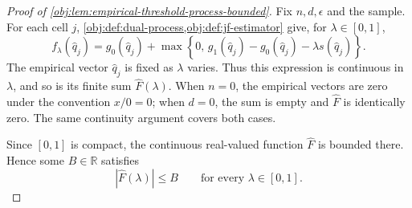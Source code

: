 \begin{proof}[Proof of \cref{obj:lem:empirical-threshold-process-bounded}]
Fix \(n,d,\epsilon\) and the sample. For each cell \(j\), \cref{obj:def:dual-process,obj:def:jf-estimator} give, for \(\lambda\in[0,1]\),
\[
f_\lambda(\widehat q_j)
=
g_0(\widehat q_j)
+
\max\!\left\{0,\,
g_1(\widehat q_j)-g_0(\widehat q_j)
-\lambda s(\widehat q_j)\right\}.
\]
The empirical vector \(\widehat q_j\) is fixed as \(\lambda\) varies. Thus this expression is continuous in \(\lambda\), and so is its finite sum \(\widehat F(\lambda)\). When \(n=0\), the empirical vectors are zero under the convention \(x/0=0\); when \(d=0\), the sum is empty and \(\widehat F\) is identically zero. The same continuity argument covers both cases. %

Since \([0,1]\) is compact, the continuous real-valued function \(\widehat F\) is bounded there. Hence some \(B\in\mathbb R\) satisfies
\[
|\widehat F(\lambda)|\leq B
\qquad\text{for every }\lambda\in[0,1].
\]
\end{proof}
